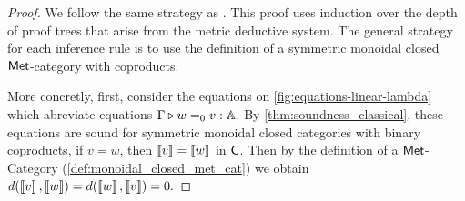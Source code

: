 \begin{proof}
  We follow the same strategy as \cite{dahlqvist2023syntactic}.
  This proof uses induction over the depth of proof trees that
  arise from the metric deductive system. The general strategy for each
  inference rule is to use the definition of a symmetric monoidal closed $\mathsf{Met}$-category with coproducts. 

   More concretly, first, consider the equations on \autoref{fig:equations-linear-lambda} which abreviate equations $\Gamma \triangleright w =_0 v : \mathbb{A}$. By \autoref{thm:soundness_classical}, these equations are sound for symmetric monoidal closed categories with binary coproducts, \ie if $v=w$, then $\left \llbracket v \right \rrbracket=\left \llbracket w \right \rrbracket$ in $ \mathsf{C}$. Then by the definition of a $\mathsf{Met}$-Category (\autoref{def:monoidal_closed_met_cat}) we obtain $d(\left \llbracket v \right \rrbracket,\left \llbracket w \right \rrbracket) = d(\left \llbracket w \right \rrbracket,\left \llbracket v \right \rrbracket)=0.$ 
 

\end{proof}
